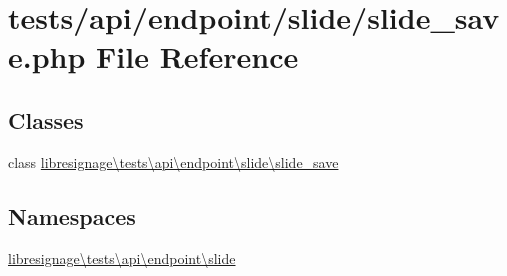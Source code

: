 \hypertarget{tests_2api_2endpoint_2slide_2slide__save_8php}{}\section{tests/api/endpoint/slide/slide\+\_\+save.php File Reference}
\label{tests_2api_2endpoint_2slide_2slide__save_8php}
\subsection*{Classes}
\begin{DoxyCompactItemize}
\item 
class \hyperlink{classlibresignage_1_1tests_1_1api_1_1endpoint_1_1slide_1_1slide__save}{libresignage\textbackslash{}tests\textbackslash{}api\textbackslash{}endpoint\textbackslash{}slide\textbackslash{}slide\+\_\+save}
\end{DoxyCompactItemize}
\subsection*{Namespaces}
\begin{DoxyCompactItemize}
\item 
 \hyperlink{namespacelibresignage_1_1tests_1_1api_1_1endpoint_1_1slide}{libresignage\textbackslash{}tests\textbackslash{}api\textbackslash{}endpoint\textbackslash{}slide}
\end{DoxyCompactItemize}
